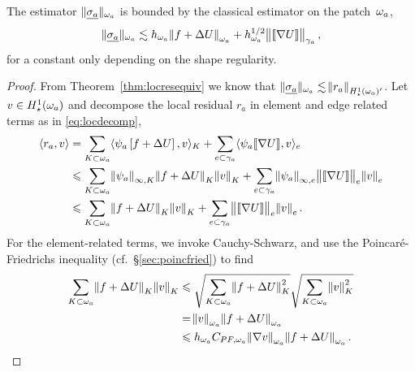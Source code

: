 \documentclass[thesis.tex]{subfiles}
\begin{document}
  \begin{lem}
  The estimator $\| \underline{\sigma_a} \|_{\omega_a}$ is bounded by the classical estimator on the patch~$\omega_a$, 
  \[
    \| \underline{\sigma_a} \|_{\omega_a} \lesssim h_{\omega_a}\norm{f + \Delta U}_{\omega_a} + h^{1/2}_{\omega_a} \norm{\llbracket \nabla U  \rrbracket}_{\gamma_a},
  \]
  for a constant only depending on the shape regularity.
  \end{lem}
  \begin{proof}
  From Theorem~\ref{thm:locresequiv} we know that $\| \underline{\sigma_a} \|_{\omega_a} \lesssim \norm{r_a}_{H_\star^1(\omega_a)'}$.
  Let $v \in H_\star^1(\omega_a)$ and decompose the local residual $r_a$ in element and edge related terms as in \eqref{eq:locdecomp},
  \begin{equation}
    \label{eq:locresupper}
  \begin{aligned}
    \langle r_a, v \rangle &= \sum_{K \subset \omega_a} \langle \psi_a\left[f + \Delta U\right], v \rangle_{K} + \sum_{e \subset \gamma_a} \langle \psi_a \llbracket \nabla U \rrbracket, v \rangle_e\\
    &\leqslant \sum_{K \subset \omega_a} \norm{\psi_a}_{\infty,K} \norm{f + \Delta U}_{K}\norm{v}_{K} + \sum_{e \subset \gamma_a} \norm{\psi_a}_{\infty, e} \norm{ \llbracket \nabla U \rrbracket}_e \norm{v}_e\\
    &\leqslant \sum_{K \subset \omega_a} \norm{f + \Delta U}_{K}\norm{v}_{K} + \sum_{e \subset \gamma_a} \norm{ \llbracket \nabla U \rrbracket}_e \norm{v}_e.
  \end{aligned}
\end{equation}
  For the element-related terms, we invoke Cauchy-Schwarz, and use the
  Poincar\'e-Friedrichs inequality (cf.~\S\ref{sec:poincfried}) to find
  \begin{align*}
    \sum_{K \subset \omega_a} \norm{f + \Delta U}_{K} \norm{v}_K &\leqslant \sqrt{\sum_{K \subset \omega_a} \norm{f + \Delta U}^2_K}\sqrt{\sum_{K \subset \omega_a} \norm{v}^2_K} \\
    &= \norm{v}_{\omega_a} \norm{f + \Delta U}_{\omega_a} \\
    &\leqslant h_{\omega_a} C_{PF,\omega_a} \norm{\nabla v}_{\omega_a} \norm{f + \Delta U}_{\omega_a}.
  \end{align*}


\end{proof}
\end{document}
